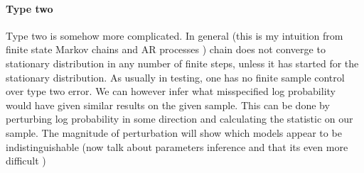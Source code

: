 \documentclass{article}
\begin{document}
\paragraph{Type two}
Type two is somehow more complicated. In general (this is my intuition from finite state Markov chains and AR processes ) chain does not converge to stationary distribution in any number of finite steps, unless it has started for the stationary distribution. As usually in testing, one has no finite sample control over type two error. We can however infer what misspecified log probability would have given similar results on the given sample. This can be done by perturbing log probability in some direction and calculating the statistic on our sample. The magnitude of perturbation will show which models appear to be indistinguishable (now talk about parameters inference and that its even more difficult )    
\end{document}
